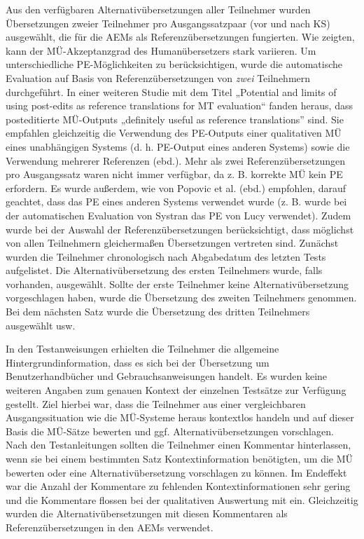 Aus den verfügbaren Alternativübersetzungen aller Teilnehmer wurden Übersetzungen zweier Teilnehmer pro Ausgangssatzpaar (vor und nach KS) ausgewählt, die für die AEMs als Referenzübersetzungen fungierten. Wie \citet{DenkowskiLavie2012} zeigten, kann der MÜ-Akzeptanzgrad des Humanübersetzers stark variieren. Um unterschiedliche PE-Möglichkeiten zu berücksichtigen, wurde die automatische Evaluation auf Basis von Referenzübersetzungen von \textit{zwei} Teilnehmern durchgeführt. In einer weiteren Studie mit dem Titel „Potential and limits of using post-edits as reference translations for MT evaluation“ fanden \citet{PopovićEtAl2016} heraus, dass posteditierte MÜ-Outputs „definitely useful as reference translations” sind. Sie empfahlen gleichzeitig die Verwendung des PE-Outputs einer qualitativen MÜ eines unabhängigen Systems (d. h. PE-Output eines anderen Systems) sowie die Verwendung mehrerer Referenzen (ebd.). Mehr als zwei Referenzübersetzungen pro Ausgangssatz waren nicht immer verfügbar, da z. B. korrekte MÜ kein PE erfordern. Es wurde außerdem, wie von Popovic et al. (ebd.) empfohlen, darauf geachtet, dass das PE eines anderen Systems verwendet wurde (z. B. wurde bei der automatischen Evaluation von Systran das PE von Lucy verwendet). Zudem wurde bei der Auswahl der Referenzübersetzungen berücksichtigt, dass möglichst von allen Teilnehmern gleichermaßen Übersetzungen vertreten sind. Zunächst wurden die Teilnehmer chronologisch nach Abgabedatum des letzten Tests aufgelistet. Die Alternativübersetzung des ersten Teilnehmers wurde, falls vorhanden, ausgewählt. Sollte der erste Teilnehmer keine Alternativübersetzung vorgeschlagen haben, wurde die Übersetzung des zweiten Teilnehmers genommen. Bei dem nächsten Satz wurde die Übersetzung des dritten Teilnehmers ausgewählt usw.

In den Testanweisungen erhielten die Teilnehmer die allgemeine Hintergrundinformation, dass es sich bei der Übersetzung um Benutzerhandbücher und Gebrauchsanweisungen handelt. Es wurden keine weiteren Angaben zum genauen Kontext der einzelnen Testsätze zur Verfügung gestellt. Ziel hierbei war, dass die Teilnehmer aus einer vergleichbaren Ausgangssituation wie die MÜ-Systeme heraus kontextlos handeln und auf dieser Basis die MÜ-Sätze bewerten und ggf. Alternativübersetzungen vorschlagen. Nach den Testanleitungen sollten die Teilnehmer einen Kommentar hinterlassen, wenn sie bei einem bestimmten Satz Kontextinformation benötigten, um die MÜ bewerten oder eine Alternativübersetzung vorschlagen zu können. Im Endeffekt war die Anzahl der Kommentare zu fehlenden Kontextinformationen sehr gering und die Kommentare flossen bei der qualitativen Auswertung mit ein. Gleichzeitig wurden die Alternativübersetzungen mit diesen Kommentaren als Referenzübersetzungen in den AEMs verwendet.

